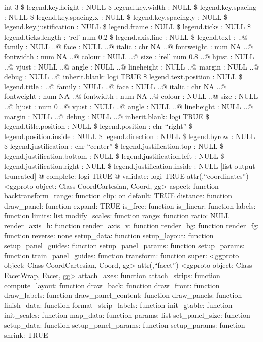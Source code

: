 \documentclass[
]{article}
\begin{document}
int 3 \$ legend.key.height : NULL \$ legend.key.width : NULL \$
legend.key.spacing : NULL \$ legend.key.spacing.x : NULL \$
legend.key.spacing.y : NULL \$ legend.key.justification : NULL \$
legend.frame : NULL \$ legend.ticks : NULL \$ legend.ticks.length :
`rel' num 0.2 \$ legend.axis.line : NULL \$ legend.text : ..@ family :
NULL ..@ face : NULL ..@ italic : chr NA ..@ fontweight : num NA ..@
fontwidth : num NA ..@ colour : NULL ..@ size : `rel' num 0.8 ..@ hjust
: NULL ..@ vjust : NULL ..@ angle : NULL ..@ lineheight : NULL ..@
margin : NULL ..@ debug : NULL ..@ inherit.blank: logi TRUE \$
legend.text.position : NULL \$ legend.title : ..@ family : NULL ..@ face
: NULL ..@ italic : chr NA ..@ fontweight : num NA ..@ fontwidth : num
NA ..@ colour : NULL ..@ size : NULL ..@ hjust : num 0 ..@ vjust : NULL
..@ angle : NULL ..@ lineheight : NULL ..@ margin : NULL ..@ debug :
NULL ..@ inherit.blank: logi TRUE \$ legend.title.position : NULL \$
legend.position : chr ``right'' \$ legend.position.inside : NULL \$
legend.direction : NULL \$ legend.byrow : NULL \$ legend.justification :
chr ``center'' \$ legend.justification.top : NULL \$
legend.justification.bottom : NULL \$ legend.justification.left : NULL
\$ legend.justification.right : NULL \$ legend.justification.inside :
NULL {[}list output truncated{]} @ complete: logi TRUE @ validate: logi
TRUE attr(,``coordinates'') \textless ggproto object: Class
CoordCartesian, Coord, gg\textgreater{} aspect: function
backtransform\_range: function clip: on default: TRUE distance: function
draw\_panel: function expand: TRUE is\_free: function is\_linear:
function labels: function limits: list modify\_scales: function range:
function ratio: NULL render\_axis\_h: function render\_axis\_v: function
render\_bg: function render\_fg: function reverse: none setup\_data:
function setup\_layout: function setup\_panel\_guides: function
setup\_panel\_params: function setup\_params: function
train\_panel\_guides: function transform: function super:
\textless ggproto object: Class CoordCartesian, Coord, gg\textgreater{}
attr(,``facet'') \textless ggproto object: Class FacetWrap, Facet,
gg\textgreater{} attach\_axes: function attach\_strips: function
compute\_layout: function draw\_back: function draw\_front: function
draw\_labels: function draw\_panel\_content: function draw\_panels:
function finish\_data: function format\_strip\_labels: function
init\_gtable: function init\_scales: function map\_data: function
params: list set\_panel\_size: function setup\_data: function
setup\_panel\_params: function setup\_params: function shrink: TRUE
\end{document}
